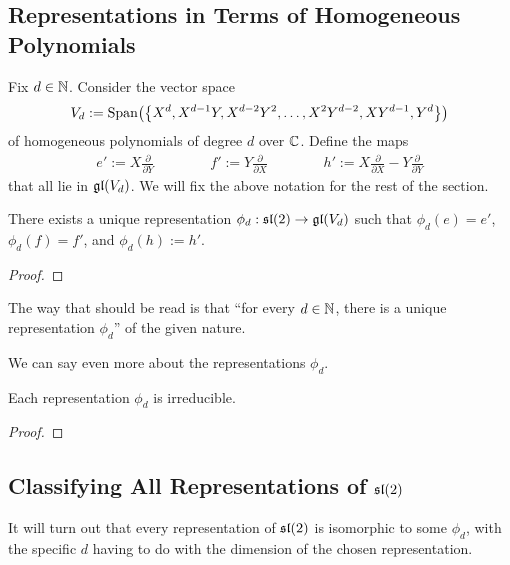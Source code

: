 \subsection{Representations in Terms of Homogeneous Polynomials}

Fix $d \in \N$. Consider the vector space
\begin{align*}
    V_d := \Span{\set{X^d, X^{d-1}Y, X^{d-2}Y^2, \ldots, X^2Y^{d-2}, XY^{d-1}, Y^d}}
\end{align*}
of homogeneous polynomials of degree $d$ over $\C$. Define the maps
\begin{align}
    e' := X \frac{\partial}{\partial Y}
    \qquad\qquad
    f' := Y \frac{\partial}{\partial X}
    \qquad\qquad
    h' := X \frac{\partial}{\partial X} - Y \frac{\partial}{\partial Y}
\end{align}
that all lie in $\gl{V_d}$. We will fix the above notation for the rest of the section.

\begin{boxproposition}\label{Ch2:Prop:UniqueRepinVdOfsl2}
    There exists a unique representation $\phi_d : \sl{2} \to \gl{V_d}$ such that $\phi_d(e) = e'$, $\phi_d(f) = f'$, and $\phi_d(h) := h'$.
\end{boxproposition}
\begin{proof}
    
\end{proof}

The way that  should be read is that ``for every $d \in \N$, there is a unique representation $\phi_d$'' of the given nature.

We can say even more about the representations $\phi_d$.

\begin{boxtheorem}\label{Ch2:Thm:IrredRepVdOfsl2}
    Each representation $\phi_d$ is irreducible.
\end{boxtheorem}
\begin{proof}
    
\end{proof}

\subsection{Classifying All Representations of $\sl{2}$}

It will turn out that every representation of $\sl{2}$ is isomorphic to some $\phi_d$, with the specific $d$ having to do with the dimension of the chosen representation.

